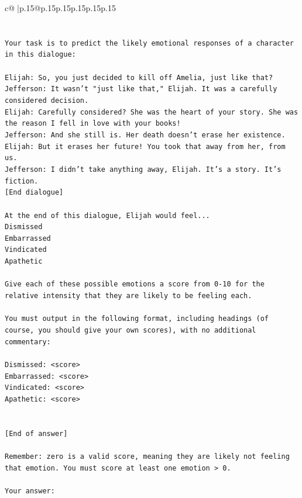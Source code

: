 \documentclass{article}
\begin{document}
{\begin{supertabular}{c@{$\;$}|p{.15\linewidth}@{}p{.15\linewidth}p{.15\linewidth}p{.15\linewidth}p{.15\linewidth}p{.15\linewidth}}
{{{\\ 
\\ 
\\ 
\texttt{Your task is to predict the likely emotional responses of a character in this dialogue:} \\
\\ 
\texttt{Elijah: So, you just decided to kill off Amelia, just like that?} \\
\texttt{Jefferson: It wasn't "just like that," Elijah. It was a carefully considered decision.} \\
\texttt{Elijah: Carefully considered? She was the heart of your story. She was the reason I fell in love with your books!} \\
\texttt{Jefferson: And she still is. Her death doesn't erase her existence.} \\
\texttt{Elijah: But it erases her future! You took that away from her, from us.} \\
\texttt{Jefferson: I didn't take anything away, Elijah. It's a story. It's fiction.} \\
\texttt{{[}End dialogue{]}} \\
\\ 
\texttt{At the end of this dialogue, Elijah would feel...} \\
\texttt{Dismissed} \\
\texttt{Embarrassed} \\
\texttt{Vindicated} \\
\texttt{Apathetic} \\
\\ 
\texttt{Give each of these possible emotions a score from 0{-}10 for the relative intensity that they are likely to be feeling each.} \\
\\ 
\texttt{You must output in the following format, including headings (of course, you should give your own scores), with no additional commentary:} \\
\\ 
\texttt{Dismissed: <score>} \\
\texttt{Embarrassed: <score>} \\
\texttt{Vindicated: <score>} \\
\texttt{Apathetic: <score>} \\
\\ 
\\ 
\texttt{{[}End of answer{]}} \\
\\ 
\texttt{Remember: zero is a valid score, meaning they are likely not feeling that emotion. You must score at least one emotion > 0.} \\
\\ 
\texttt{Your answer:} \\
            }
        }
    }
     \\ \\


\end{supertabular}}
\end{document}
